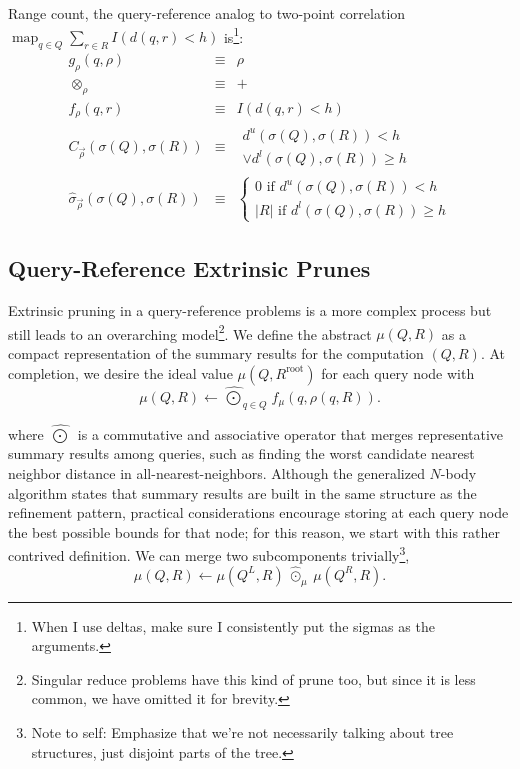 \documentclass[times, leqno,twocolumn]{article}
\newcommand{\authornote}[1]{\footnote{Note to self: #1}}
\newcommand{\authorsnote}[1]{\authornote{#1}}
\newcommand{\summary}{\hat{\sigma}}
\DeclareMathOperator*{\map}{map}
\newcommand{\kdroot}[1]{#1^{\text{root}}}
\newcommand{\kdleft}[1]{#1^{\!L}}
\newcommand{\kdright}[1]{#1^{\!R}}
\newcommand{\lo}[1]{#1^{l}}
\newcommand{\up}[1]{#1^{u}}
\newcommand{\distlo}{\lo{d}}
\newcommand{\distup}{\up{d}}
\newcommand{\dist}[2]{d(#1,#2)}
\newcommand{\nameOp}[2]{\mathop{#1\nolimits\!\!_{#2}}}
\newcommand{\nameop}[2]{{\scriptstyle\:}#1_{\!#2}}
\newcommand{\myop}[1]{\nameop{\otimes}{#1}}
\newcommand{\letterqr}{\rho}
\newcommand{\inqr}{\rho}
\newcommand{\opqr}{\myop{\letterqr}}
\newcommand{\fqr}{f_{\!\letterqr}}
\newcommand{\gqr}{g_{\!\letterqr}}
\newcommand{\letterqrv}{\vec{\rho}}
\newcommand{\deltaqrv}{\summary_{\!\letterqrv}}
\newcommand{\canpruneqrv}{C_{\!\letterqrv}}
\newcommand{\lettermu}{\mu}
\newcommand{\inmu}{\mu}
\newcommand{\Outopmu}{\widehat{\nameOp{\bigodot}{\lettermu}}}%
\newcommand{\outopmu}{\:\widehat{\odot}_{\!\mu}\:}
\newcommand{\fmu}{f_{\!\lettermu}}
\newcommand{\outstat}{\sigma}
\begin{document}
\noindent Range count, the query-reference analog to two-point correlation $\map_{q \in Q} \sum_{r \in R} I(\dist{q}{r} < h)$ is\footnote{When I use deltas, make sure I consistently put the sigmas as the arguments.}:
\begin{eqnarray*}
\gqr(q, \inqr) &\equiv& \inqr
\\
\opqr &\equiv& +
\\
\fqr(q,r) &\equiv& I(\dist{q}{r} < h)
\\
\canpruneqrv(\sigma(Q), \sigma(R))
&\equiv&
\begin{array}{l}\distup(\outstat(Q),\outstat(R)) < h \\ \vee \distlo(\outstat(Q),\outstat(R)) \geq h\end{array}
\\
\deltaqrv(\outstat(Q),\outstat(R)) &\equiv& \left\{ \begin{array}{l} 0 \text{ if } \distup(\outstat(Q),\outstat(R)) < h \\ |R| \text{ if } \distlo(\outstat(Q),\outstat(R)) \geq h \end{array}\right.
\end{eqnarray*}

\subsection{Query-Reference Extrinsic Prunes}

Extrinsic pruning in a query-reference problems is a more complex process but still leads to an overarching model\footnote{Singular reduce problems have this kind of prune too, but since it is less common, we have omitted it for brevity.}.
We define the abstract $\inmu(Q, R)$ as a compact representation of the summary results for the computation $(Q,R)$.
At completion, we desire the ideal value $\inmu(Q, \kdroot{R})$ for each query node with
\begin{equation*}
\inmu(Q, R) \gets \Outopmu_{q \in Q} \fmu(q, \inqr(q, R)).
\end{equation*}

\noindent where $\Outopmu$ is a commutative and associative operator that merges representative summary results among queries, such as finding the worst candidate nearest neighbor distance in all-nearest-neighbors.
Although the generalized $N$-body algorithm states that summary results are built in the same structure as the refinement pattern, practical considerations encourage storing at each query node the best possible bounds for that node; for this reason, we start with this rather contrived definition.
We can merge two subcomponents trivially\authorsnote{Emphasize that we're not necessarily talking about tree structures, just disjoint parts of the tree.},
\begin{equation*}
\inmu(Q, R) \gets \inmu(\kdleft{Q}, R) \outopmu \inmu(\kdright{Q}, R).
\label{eqn:dividemu}
\end{equation*}
\end{document}
